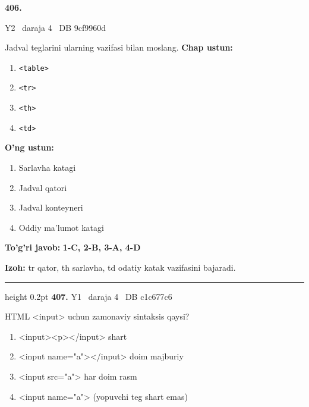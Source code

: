 \documentclass[10pt,a4paper,oneside]{article}
\begin{document}
\hypertarget{q406}{\textbf{\color{ink}406.}}  {\color{muted}\scriptsize Y2 \textbullet\ daraja 4 \textbullet\ DB 9cf9960d}
\par
Jadval teglarini ularning vazifasi bilan moslang.
\textbf{\footnotesize Chap ustun:}
\begin{enumerate}[label=\arabic*),leftmargin=9mm]
\item \texttt{\textless{}table\textgreater{}}
\item \texttt{\textless{}tr\textgreater{}}
\item \texttt{\textless{}th\textgreater{}}
\item \texttt{\textless{}td\textgreater{}}
\end{enumerate}
\textbf{\footnotesize O'ng ustun:}
\begin{enumerate}[label=\Alph*),leftmargin=9mm]
\item Sarlavha katagi
\item Jadval qatori
\item Jadval konteyneri
\item Oddiy ma'lumot katagi
\end{enumerate}
\begin{tcolorbox}[enhanced,breakable,colback=teal!4,colframe=teal!45!black,boxrule=0.45pt,arc=1.2mm,left=2.8mm,right=2.8mm,top=2mm,bottom=2mm,before skip=2mm,after skip=2mm]
\textbf{\color{teal}To'g'ri javob:} \textbf{1-C, 2-B, 3-A, 4-D}
\par\smallskip
\textbf{Izoh:} tr qator, th sarlavha, td odatiy katak vazifasini bajaradi.
\end{tcolorbox}
\vspace{2mm}\hrule height 0.2pt \vspace{4mm}
\hypertarget{q407}{\textbf{\color{ink}407.}}  {\color{muted}\scriptsize Y1 \textbullet\ daraja 4 \textbullet\ DB c1c677c6}
\par
HTML \textless{}input\textgreater{} uchun zamonaviy sintaksis qaysi?
\begin{enumerate}[label=\Alph*),leftmargin=9mm]
\item \textless{}input\textgreater{}\textless{}p\textgreater{}\textless{}/input\textgreater{} shart
\item \textless{}input name="a"\textgreater{}\textless{}/input\textgreater{} doim majburiy
\item \textless{}input src="a"\textgreater{} har doim rasm
\item \textless{}input name="a"\textgreater{} (yopuvchi teg shart emas)
\end{enumerate}
\end{document}
